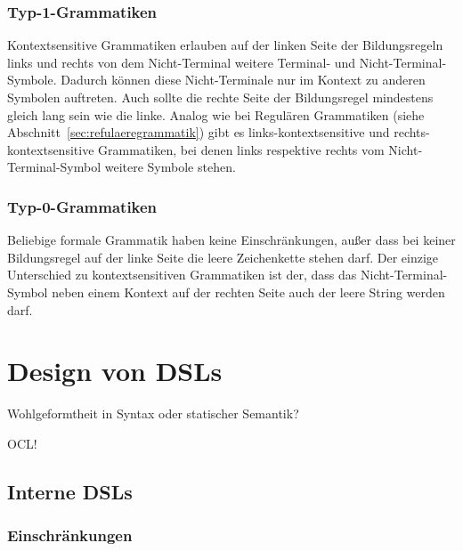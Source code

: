 \documentclass[../InterneDSLs.tex]{subfiles}
\begin{document}
\subsubsection{Typ-1-Grammatiken}\label{sec:kontextsensitivegrammatik}
Kontextsensitive Grammatiken erlauben auf der linken Seite der Bildungsregeln links und rechts von dem Nicht-Terminal weitere Terminal- und Nicht-Terminal-Symbole. Dadurch können diese Nicht-Terminale nur im Kontext zu anderen Symbolen auftreten. Auch sollte die rechte Seite der Bildungsregel mindestens gleich lang sein wie die linke. Analog wie bei Regulären Grammatiken (siehe Abschnitt~\ref{sec:refulaeregrammatik}) gibt es links-kontextsensitive und rechts-kontextsensitive Grammatiken, bei denen links respektive rechts vom Nicht-Terminal-Symbol weitere Symbole stehen.

\subsubsection{Typ-0-Grammatiken}\label{sec:beliebigegrammatik}
Beliebige formale Grammatik haben keine Einschränkungen, außer dass bei keiner Bildungsregel auf der linke Seite die leere Zeichenkette stehen darf. Der einzige Unterschied zu kontextsensitiven Grammatiken ist der, dass das Nicht-Terminal-Symbol neben einem Kontext auf der rechten Seite auch der leere String werden darf.


\section{Design von DSLs}
Wohlgeformtheit in Syntax oder statischer Semantik?

OCL!

\subsection{Interne DSLs}

\subsubsection{Einschränkungen}
\end{document}
